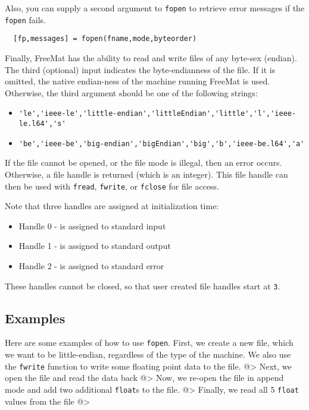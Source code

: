 Also, you can supply a second argument to \verb|fopen| to retrieve error
messages if the \verb|fopen| fails.
\begin{verbatim}
  [fp,messages] = fopen(fname,mode,byteorder)
\end{verbatim}

Finally, FreeMat has the ability to read and write files of any
byte-sex (endian).  The third (optional) input indicates the 
byte-endianness of the file.  If it is omitted, the native endian-ness
of the machine running FreeMat is used.  Otherwise, the third
argument should be one of the following strings:
\begin{itemize}
\item  \verb|'le','ieee-le','little-endian','littleEndian','little','l','ieee-le.l64','s'|

\item  \verb|'be','ieee-be','big-endian','bigEndian','big','b','ieee-be.l64','a'|

\end{itemize}
	
If the file cannot be opened, or the file mode is illegal, then
an error occurs. Otherwise, a file handle is returned (which is
an integer).  This file handle can then be used with \verb|fread|,
\verb|fwrite|, or \verb|fclose| for file access.

Note that three handles are assigned at initialization time:
\begin{itemize}
\item  Handle 0 - is assigned to standard input

\item  Handle 1 - is assigned to standard output

\item  Handle 2 - is assigned to standard error

\end{itemize}
These handles cannot be closed, so that user created file handles start at \verb|3|.

\subsection{Examples}

Here are some examples of how to use \verb|fopen|.  First, we create a new 
file, which we want to be little-endian, regardless of the type of the machine.
We also use the \verb|fwrite| function to write some floating point data to
the file.
@>
Next, we open the file and read the data back
@>
Now, we re-open the file in append mode and add two additional \verb|float|s to the
file.
@>
Finally, we read all 5 \verb|float| values from the file
@>
